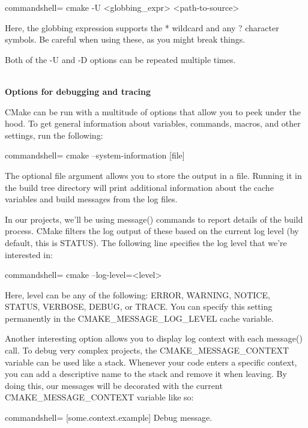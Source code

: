 \begin{tcblisting}{commandshell={}}
cmake -U <globbing_expr> <path-to-source>
\end{tcblisting}

Here, the globbing expression supports the * wildcard and any ? character symbols. Be careful when using these, as you might break things.

Both of the -U and -D options can be repeated multiple times.

\hspace*{\fill} \\ %
\noindent
\textbf{Options for debugging and tracing}

CMake can be run with a multitude of options that allow you to peek under the hood. To get general information about variables, commands, macros, and other settings, run the following:

\begin{tcblisting}{commandshell={}}
cmake --system-information [file]
\end{tcblisting}

The optional file argument allows you to store the output in a file. Running it in the build tree directory will print additional information about the cache variables and build messages from the log files.

In our projects, we'll be using message() commands to report details of the build process. CMake filters the log output of these based on the current log level (by default, this is STATUS). The following line specifies the log level that we're interested in:

\begin{tcblisting}{commandshell={}}
cmake --log-level=<level>
\end{tcblisting}

Here, level can be any of the following: ERROR, WARNING, NOTICE, STATUS, VERBOSE, DEBUG, or TRACE. You can specify this setting permanently in the CMAKE\_MESSAGE\_LOG\_LEVEL cache variable.

Another interesting option allows you to display log context with each message() call. To debug very complex projects, the CMAKE\_MESSAGE\_CONTEXT variable can be used like a stack. Whenever your code enters a specific context, you can add a descriptive name to the stack and remove it when leaving. By doing this, our messages will be decorated with the current CMAKE\_MESSAGE\_CONTEXT variable like so:

\begin{tcblisting}{commandshell={}}
[some.context.example] Debug message.
\end{tcblisting}


